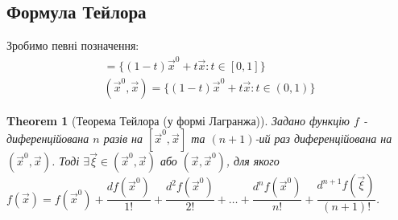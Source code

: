 \documentclass[a4paper, 10pt]{article}
\theoremstyle{theoremdd}
\newtheorem{theorem}{Theorem}[subsection]
\theoremstyle{theoremdd}
\theoremstyle{theoremdd}
\theoremstyle{theoremdd}
\theoremstyle{theoremdd}
\theoremstyle{theoremdd}
\theoremstyle{theoremdd}
\theoremstyle{theoremdd}
\theoremstyle{theoremdd}
\begin{document}
\subsection{Формула Тейлора}
Зробимо певні позначення:
\begin{align*}
[\vec{x}^0, \vec{x}] = \{(1-t)\vec{x}^0 + t \vec{x} : t \in [0,1]\} \\
(\vec{x}^0, \vec{x}) = \{(1-t)\vec{x}^0 + t \vec{x} : t \in (0,1)\}
\end{align*}

\iffalse
\begin{theorem}[Теорема Тейлора (у формі Лагранжа)]
Задано функцію $f\colon A \to \mathbb{R}$ та $\vec{x}^0 \in A$ -- внутрішня точка. Відомо, що $f$ -- диференційована $n+1$ разів в околі точки $\vec{x}^0$. Тоді $\exists \vec{\xi} \in (\vec{x}^0,\vec{x})$ або $(\vec{x},\vec{x}^0)$, для якого\\
$f(\vec{x}) = f(\vec{x}^0) + \dfrac{df(\vec{x}^0)}{1!} + \dfrac{d^2 f(\vec{x}^0)}{2!} + \dots  + \dfrac{d^{n} f(\vec{x}^0)}{n!} + \dfrac{d^{n+1} f(\vec{\xi})}{(n+1)!}$.\\
Інтервал $(\vec{x}^0,\vec{x})$ або $(\vec{x},\vec{x}^0)$ лежать всередині околу.
\end{theorem}
\fi

\begin{theorem}[Теорема Тейлора (у формі Лагранжа)]
Задано функцію $f$ - диференційована $n$ разів на $[\vec{x}^0,\vec{x}]$ та $(n+1)$-ий раз диференційована на $(\vec{x}^0,\vec{x})$. Тоді $\exists \vec{\xi} \in (\vec{x}^0,\vec{x})$ або $(\vec{x},\vec{x}^0)$, для якого\\
$f(\vec{x}) = f(\vec{x}^0) + \dfrac{df(\vec{x}^0)}{1!} + \dfrac{d^2 f(\vec{x}^0)}{2!} + \dots  + \dfrac{d^{n} f(\vec{x}^0)}{n!} + \dfrac{d^{n+1} f(\vec{\xi})}{(n+1)!}$.
\end{theorem}
\end{document}
